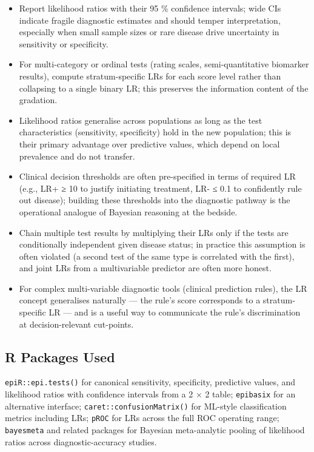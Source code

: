 \documentclass[
]{article}
\providecommand{\tightlist}{%
  \setlength{\itemsep}{0pt}\setlength{\parskip}{0pt}}
\begin{document}
\begin{itemize}
\tightlist
\item
  Report likelihood ratios with their 95 \% confidence intervals; wide
  CIs indicate fragile diagnostic estimates and should temper
  interpretation, especially when small sample sizes or rare disease
  drive uncertainty in sensitivity or specificity.
\item
  For multi-category or ordinal tests (rating scales, semi-quantitative
  biomarker results), compute stratum-specific LRs for each score level
  rather than collapsing to a single binary LR; this preserves the
  information content of the gradation.
\item
  Likelihood ratios generalise across populations as long as the test
  characteristics (sensitivity, specificity) hold in the new population;
  this is their primary advantage over predictive values, which depend
  on local prevalence and do not transfer.
\item
  Clinical decision thresholds are often pre-specified in terms of
  required LR (e.g., LR+ ≥ 10 to justify initiating treatment, LR- ≤ 0.1
  to confidently rule out disease); building these thresholds into the
  diagnostic pathway is the operational analogue of Bayesian reasoning
  at the bedside.
\item
  Chain multiple test results by multiplying their LRs only if the tests
  are conditionally independent given disease status; in practice this
  assumption is often violated (a second test of the same type is
  correlated with the first), and joint LRs from a multivariable
  predictor are often more honest.
\item
  For complex multi-variable diagnostic tools (clinical prediction
  rules), the LR concept generalises naturally --- the rule's score
  corresponds to a stratum-specific LR --- and is a useful way to
  communicate the rule's discrimination at decision-relevant cut-points.
\end{itemize}

\subsection{R Packages Used}\label{r-packages-used}

\texttt{epiR::epi.tests()} for canonical sensitivity, specificity,
predictive values, and likelihood ratios with confidence intervals from
a 2 × 2 table; \texttt{epibasix} for an alternative interface;
\texttt{caret::confusionMatrix()} for ML-style classification metrics
including LRs; \texttt{pROC} for LRs across the full ROC operating
range; \texttt{bayesmeta} and related packages for Bayesian
meta-analytic pooling of likelihood ratios across diagnostic-accuracy
studies.
\end{document}

